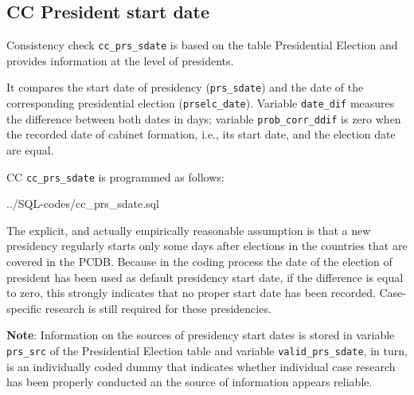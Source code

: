 \subsection{CC President start date}
Consistency check \texttt{\footnotesize cc\_prs\_sdate} is based on the table Presidential Election and provides information at the level of presidents.

It compares the start date of presidency (\texttt{\footnotesize prs\_sdate}) and the date of the corresponding presidential election (\texttt{\footnotesize prselc\_date}). Variable \texttt{\footnotesize date\_dif} measures the difference between both dates in days; variable \texttt{\footnotesize prob\_corr\_ddif} is zero when the recorded date of cabinet formation, i.e., its start date, and the election date are equal. 

CC \texttt{\footnotesize cc\_prs\_sdate} is programmed as follows:

%
{../SQL-codes/cc_prs_sdate.sql}

The explicit, and actually empirically reasonable assumption is that a new presidency regularly starts only some days after elections in the countries that are covered in the PCDB. Because in the coding process the date of the election of president has been used as default presidency start date, if the difference is equal to zero, this strongly indicates that no proper start date has been recorded. Case-specific research is still required for these presidencies.

\textbf{Note}: Information on the sources of presidency start dates is stored in variable \texttt{\footnotesize prs\_src} of the Presidential Election table and variable \texttt{\footnotesize valid\_prs\_sdate}, in turn, is an individually coded dummy that indicates whether individual case research has been properly conducted an the source of information appears reliable.
